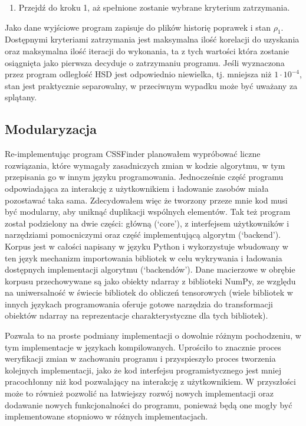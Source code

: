 \documentclass[11pt, a4paper]{article}
\begin{document}
\begin{sloppypar}
\begin{enumerate}
      \item Przejdź do kroku 1, aż spełnione zostanie wybrane kryterium zatrzymania.
    \end{enumerate}

    Jako dane wyjściowe program zapisuje do plików historię poprawek i stan $\rho_{1}$. Dostępnymi
    kryteriami zatrzymania jest maksymalna ilość korelacji do uzyskania oraz maksymalna ilość
    iteracji do wykonania, ta z tych wartości która zostanie osiągnięta jako pierwsza
    decyduje o zatrzymaniu programu. Jeśli wyznaczona przez program odległość HSD jest odpowiednio
    niewielka, tj. mniejsza niż $1 \cdot 10^{-4}$, stan jest praktycznie separowalny, w przeciwnym
    wypadku może być uważany za splątany.

    \subsection{Modularyzacja}


    Re-implementując program CSSFinder planowałem wypróbować liczne rozwiązania, które
    wymagały zasadniczych zmian w kodzie algorytmu, w tym przepisania go w innym języku programowania.
    Jednocześnie część programu odpowiadająca za interakcję z użytkownikiem i ładowanie
    zasobów miała pozostawać taka sama. Zdecydowałem więc że tworzony przeze mnie kod musi
    być modularny, aby uniknąć duplikacji wspólnych elementów. Tak też program został podzielony
    na dwie części: główną (`core'), z interfejsem użytkowników i narzędziami pomocniczymi
    oraz część implementującą algorytm (`backend'). Korpus jest w całości napisany w
    języku Python i wykorzystuje wbudowany w ten język mechanizm importowania bibliotek
    w celu wykrywania i ładowania dostępnych implementacji algorytmu (`backendów'). Dane
    macierzowe w obrębie korpusu przechowywane są jako obiekty ndarray z biblioteki NumPy,
    ze względu na uniwersalność w świecie bibliotek do obliczeń tensorowych (wiele bibliotek
    w innych językach programowania oferuje gotowe narzędzia do transformacji obiektów ndarray
    na reprezentacje charakterystyczne dla tych bibliotek).

    Pozwala to na proste podmiany implementacji o dowolnie różnym pochodzeniu, w tym implementacje
    w językach kompilowanych. Uprościło to znacznie proces weryfikacji zmian w
    zachowaniu programu i przyspieszyło proces tworzenia kolejnych implementacji, jako że
    kod interfejsu programistycznego jest mniej pracochłonny niż kod pozwalający na interakcję
    z użytkownikiem. W przyszłości może to również pozwolić na łatwiejszy rozwój nowych
    implementacji oraz dodawanie nowych funkcjonalności do programu, ponieważ będą one mogły
    być implementowane stopniowo w różnych implementacjach.


\end{sloppypar}
\end{document}
